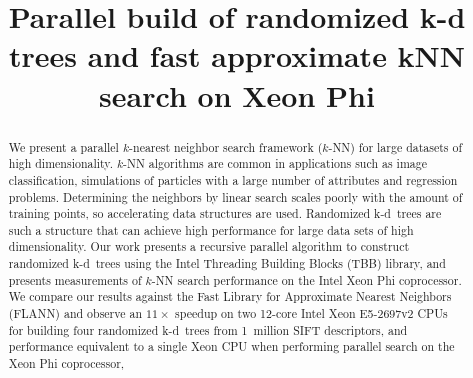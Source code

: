 \documentclass[letterpaper]{article}
\title{Parallel build of randomized k-d trees and fast approximate kNN search on Xeon Phi}
\begin{document}
\maketitle

\begin{abstract}
  We present a parallel $k$-nearest neighbor search framework ($k$-NN) for 
  large datasets of high dimensionality.  $k$-NN algorithms are common in
  applications such as image classification, simulations of particles with a
  large number of attributes and regression problems.  Determining the neighbors
  by linear search scales poorly with the amount of training points, so
  accelerating data structures are used.  Randomized k-d~trees are
  such a structure that can achieve high performance for large data sets of high
  dimensionality.  Our work presents a recursive parallel algorithm
  to construct randomized k-d~trees using the Intel Threading Building Blocks
  (TBB) library, and presents measurements of $k$-NN search performance on the
  Intel Xeon Phi coprocessor.  We compare our results against the Fast Library
  for Approximate Nearest Neighbors (FLANN) and observe an $11\times$ speedup on
  two 12-core Intel Xeon E5-2697v2 CPUs for building four randomized
  k-d~trees from 1~million SIFT descriptors, and performance
  equivalent to a single Xeon CPU when performing parallel search on the
  Xeon Phi coprocessor,  


  \end{abstract}

  
  
  
  
  

  
  
\end{document}
